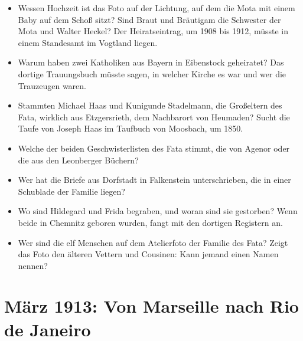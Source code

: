 \documentclass[
  ngerman,
  11pt,
  openany]{book}
\providecommand{\tightlist}{%
  \setlength{\itemsep}{0pt}\setlength{\parskip}{0pt}}
\begin{document}
\begin{itemize}
\tightlist
\item
  Wessen Hochzeit ist das Foto auf der Lichtung, auf dem die Mota mit
  einem Baby auf dem Schoß sitzt? Sind Braut und Bräutigam die Schwester
  der Mota und Walter Heckel? Der Heiratseintrag, um 1908 bis 1912,
  müsste in einem Standesamt im Vogtland liegen.
\item
  Warum haben zwei Katholiken aus Bayern in Eibenstock geheiratet? Das
  dortige Trauungsbuch müsste sagen, in welcher Kirche es war und wer
  die Trauzeugen waren.
\item
  Stammten Michael Haas und Kunigunde Stadelmann, die Großeltern des
  Fata, wirklich aus Etzgersrieth, dem Nachbarort von Heumaden? Sucht
  die Taufe von Joseph Haas im Taufbuch von Moosbach, um 1850.
\item
  Welche der beiden Geschwisterlisten des Fata stimmt, die von Agenor
  oder die aus den Leonberger Büchern?
\item
  Wer hat die Briefe aus Dorfstadt in Falkenstein unterschrieben, die in
  einer Schublade der Familie liegen?
\item
  Wo sind Hildegard und Frida begraben, und woran sind sie gestorben?
  Wenn beide in Chemnitz geboren wurden, fangt mit den dortigen
  Registern an.
\item
  Wer sind die elf Menschen auf dem Atelierfoto der Familie des Fata?
  Zeigt das Foto den älteren Vettern und Cousinen: Kann jemand einen
  Namen nennen?
\end{itemize}

\chapter{März 1913: Von Marseille nach Rio de Janeiro}\label{cap-5}
\end{document}
